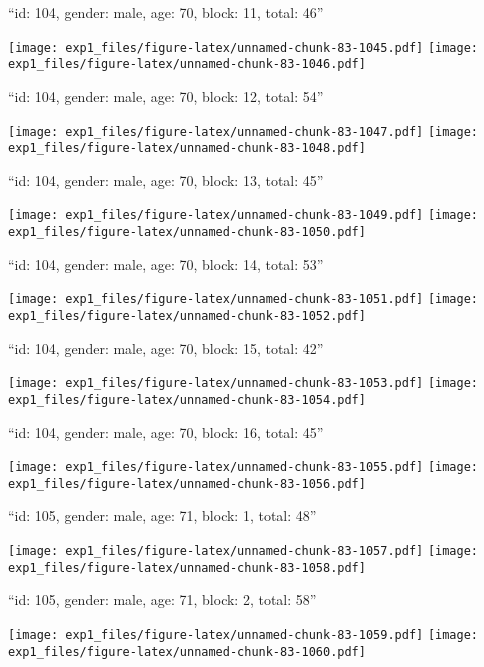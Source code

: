 \documentclass[11pt,,]{article}
\begin{document}
\newpage
[1] 

``id: 104, gender: male, age: 70, block: 11, total: 46''

\texttt{[image: exp1\_files/figure-latex/unnamed-chunk-83-1045.pdf]}
\texttt{[image: exp1\_files/figure-latex/unnamed-chunk-83-1046.pdf]}

\newpage
[1] 

``id: 104, gender: male, age: 70, block: 12, total: 54''

\texttt{[image: exp1\_files/figure-latex/unnamed-chunk-83-1047.pdf]}
\texttt{[image: exp1\_files/figure-latex/unnamed-chunk-83-1048.pdf]}

\newpage
[1] 

``id: 104, gender: male, age: 70, block: 13, total: 45''

\texttt{[image: exp1\_files/figure-latex/unnamed-chunk-83-1049.pdf]}
\texttt{[image: exp1\_files/figure-latex/unnamed-chunk-83-1050.pdf]}

\newpage
[1] 

``id: 104, gender: male, age: 70, block: 14, total: 53''

\texttt{[image: exp1\_files/figure-latex/unnamed-chunk-83-1051.pdf]}
\texttt{[image: exp1\_files/figure-latex/unnamed-chunk-83-1052.pdf]}

\newpage
[1] 

``id: 104, gender: male, age: 70, block: 15, total: 42''

\texttt{[image: exp1\_files/figure-latex/unnamed-chunk-83-1053.pdf]}
\texttt{[image: exp1\_files/figure-latex/unnamed-chunk-83-1054.pdf]}

\newpage
[1] 

``id: 104, gender: male, age: 70, block: 16, total: 45''

\texttt{[image: exp1\_files/figure-latex/unnamed-chunk-83-1055.pdf]}
\texttt{[image: exp1\_files/figure-latex/unnamed-chunk-83-1056.pdf]}

\newpage
[1] 

``id: 105, gender: male, age: 71, block: 1, total: 48''

\texttt{[image: exp1\_files/figure-latex/unnamed-chunk-83-1057.pdf]}
\texttt{[image: exp1\_files/figure-latex/unnamed-chunk-83-1058.pdf]}

\newpage
[1] 

``id: 105, gender: male, age: 71, block: 2, total: 58''

\texttt{[image: exp1\_files/figure-latex/unnamed-chunk-83-1059.pdf]}
\texttt{[image: exp1\_files/figure-latex/unnamed-chunk-83-1060.pdf]}
\end{document}
